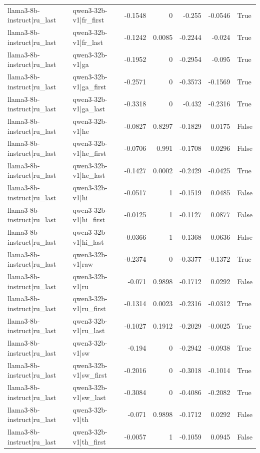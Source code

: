 \begin{table}
\begin{tabular}{l l r r r r l}
llama3-8b-instruct|ru_last & qwen3-32b-v1|fr_first & -0.1548 & 0 & -0.255 & -0.0546 & True \\
llama3-8b-instruct|ru_last & qwen3-32b-v1|fr_last & -0.1242 & 0.0085 & -0.2244 & -0.024 & True \\
llama3-8b-instruct|ru_last & qwen3-32b-v1|ga & -0.1952 & 0 & -0.2954 & -0.095 & True \\
llama3-8b-instruct|ru_last & qwen3-32b-v1|ga_first & -0.2571 & 0 & -0.3573 & -0.1569 & True \\
llama3-8b-instruct|ru_last & qwen3-32b-v1|ga_last & -0.3318 & 0 & -0.432 & -0.2316 & True \\
llama3-8b-instruct|ru_last & qwen3-32b-v1|he & -0.0827 & 0.8297 & -0.1829 & 0.0175 & False \\
llama3-8b-instruct|ru_last & qwen3-32b-v1|he_first & -0.0706 & 0.991 & -0.1708 & 0.0296 & False \\
llama3-8b-instruct|ru_last & qwen3-32b-v1|he_last & -0.1427 & 0.0002 & -0.2429 & -0.0425 & True \\
llama3-8b-instruct|ru_last & qwen3-32b-v1|hi & -0.0517 & 1 & -0.1519 & 0.0485 & False \\
llama3-8b-instruct|ru_last & qwen3-32b-v1|hi_first & -0.0125 & 1 & -0.1127 & 0.0877 & False \\
llama3-8b-instruct|ru_last & qwen3-32b-v1|hi_last & -0.0366 & 1 & -0.1368 & 0.0636 & False \\
llama3-8b-instruct|ru_last & qwen3-32b-v1|raw & -0.2374 & 0 & -0.3377 & -0.1372 & True \\
llama3-8b-instruct|ru_last & qwen3-32b-v1|ru & -0.071 & 0.9898 & -0.1712 & 0.0292 & False \\
llama3-8b-instruct|ru_last & qwen3-32b-v1|ru_first & -0.1314 & 0.0023 & -0.2316 & -0.0312 & True \\
llama3-8b-instruct|ru_last & qwen3-32b-v1|ru_last & -0.1027 & 0.1912 & -0.2029 & -0.0025 & True \\
llama3-8b-instruct|ru_last & qwen3-32b-v1|sw & -0.194 & 0 & -0.2942 & -0.0938 & True \\
llama3-8b-instruct|ru_last & qwen3-32b-v1|sw_first & -0.2016 & 0 & -0.3018 & -0.1014 & True \\
llama3-8b-instruct|ru_last & qwen3-32b-v1|sw_last & -0.3084 & 0 & -0.4086 & -0.2082 & True \\
llama3-8b-instruct|ru_last & qwen3-32b-v1|th & -0.071 & 0.9898 & -0.1712 & 0.0292 & False \\
llama3-8b-instruct|ru_last & qwen3-32b-v1|th_first & -0.0057 & 1 & -0.1059 & 0.0945 & False \\

\end{tabular}
\end{table}
